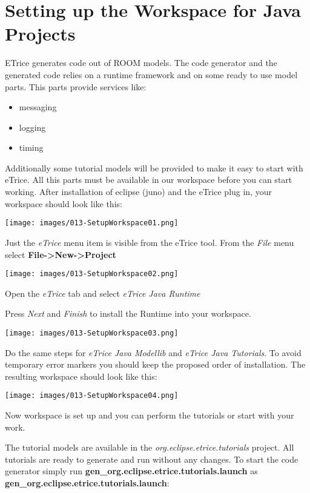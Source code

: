 \chapter{Setting up the Workspace for Java Projects}

ETrice generates code out of ROOM models. The code generator and the generated code relies on a runtime framework and on some ready to use model parts. This parts provide services like:

\begin{itemize}
\item messaging
\item logging
\item timing
\end{itemize}

Additionally some tutorial models will be provided to make it easy to start with eTrice. All this parts must be available in our workspace before you can start working. After installation of eclipse (juno) and the eTrice plug in, your workspace should look like this:  

\texttt{[image: images/013-SetupWorkspace01.png]}

Just the \textit{eTrice} menu item is visible from the eTrice tool.
From the \textit{File} menu select \textbf{File->New->Project}

\texttt{[image: images/013-SetupWorkspace02.png]}

Open the \textit{eTrice} tab and select \textit{eTrice Java Runtime}

Press \textit{Next} and \textit{Finish} to install the Runtime into your workspace.

\texttt{[image: images/013-SetupWorkspace03.png]}

Do the same steps for \textit{eTrice Java Modellib} and \textit{eTrice Java Tutorials}. To avoid temporary error markers you should keep the proposed order of installation. The resulting workspace should look like this:

\texttt{[image: images/013-SetupWorkspace04.png]}

Now workspace is set up and you can perform the tutorials or start with your work.

The tutorial models are available in the \textit{org.eclipse.etrice.tutorials} project. All tutorials are ready to generate and run without any changes. To start the code generator simply run \textbf{gen\_org.eclipse.etrice.tutorials.launch} as \textbf{gen\_org.eclipse.etrice.tutorials.launch}: 

